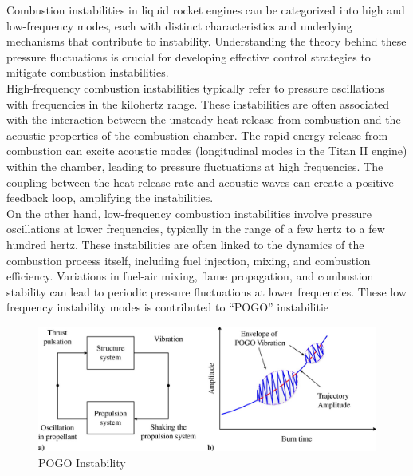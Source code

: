 \documentclass[8pt]{article} %
\begin{document}
Combustion instabilities in liquid rocket engines can be categorized into high and low-frequency modes, each with distinct characteristics and underlying mechanisms that contribute to instability. Understanding the theory behind these pressure fluctuations is crucial for developing effective control strategies to mitigate combustion instabilities.\\High-frequency combustion instabilities typically refer to pressure oscillations with frequencies in the kilohertz range. These instabilities are often associated with the interaction between the unsteady heat release from combustion and the acoustic properties of the combustion chamber. The rapid energy release from combustion can excite acoustic modes (longitudinal modes in the Titan II engine)\cite{CI in LRE}  within the chamber, leading to pressure fluctuations at high frequencies. The coupling between the heat release rate and acoustic waves can create a positive feedback loop, amplifying the instabilities.
\\On the other hand, low-frequency combustion instabilities involve pressure oscillations at lower frequencies, typically in the range of a few hertz to a few hundred hertz. These instabilities are often linked to the dynamics of the combustion process itself, including fuel injection, mixing, and combustion efficiency. Variations in fuel-air mixing, flame propagation, and combustion stability can lead to periodic pressure fluctuations at lower frequencies. These low frequency instability modes is contributed to “POGO” instabilitie\cite{POGO}
\begin{figure}[H] 
\centering
\includegraphics[width=0.8\columnwidth]{./pogo.jpeg}
\caption{ POGO Instability}
\label{fig:POGO Instability}
\end{figure}
\end{document}
